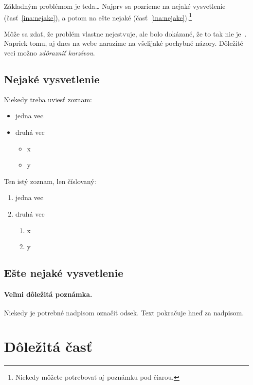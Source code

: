 \documentclass[10pt,twoside,slovak,a4paper]{article}
\begin{document}
Základným problémom je teda\ldots{} Najprv sa pozrieme na nejaké vysvetlenie (časť~\ref{ina:nejake}), a potom na ešte nejaké (časť~\ref{ina:nejake}).\footnote{Niekedy môžete potrebovať aj poznámku pod čiarou.}

Môže sa zdať, že problém vlastne nejestvuje\cite{Coplien:MPD}, ale bolo dokázané, že to tak nie je~\cite{Czarnecki:Staged, Czarnecki:Progress}. Napriek tomu, aj dnes na webe narazíme na všelijaké pochybné názory\cite{PLP-Framework}. Dôležité veci možno \emph{zdôrazniť kurzívou}.


\subsection{Nejaké vysvetlenie} \label{ina:2}

Niekedy treba uviesť zoznam:

\begin{itemize}
\item jedna vec
\item druhá vec
	\begin{itemize}
	\item x
	\item y
	\end{itemize}
\end{itemize}

Ten istý zoznam, len číslovaný:

\begin{enumerate}
\item jedna vec
\item druhá vec
	\begin{enumerate}
	\item x
	\item y
	\end{enumerate}
\end{enumerate}


\subsection{Ešte nejaké vysvetlenie} \label{ina:este}

\paragraph{Veľmi dôležitá poznámka.}
Niekedy je potrebné nadpisom označiť odsek. Text pokračuje hneď za nadpisom.



\section{Dôležitá časť} \label{dolezita}
\end{document}
